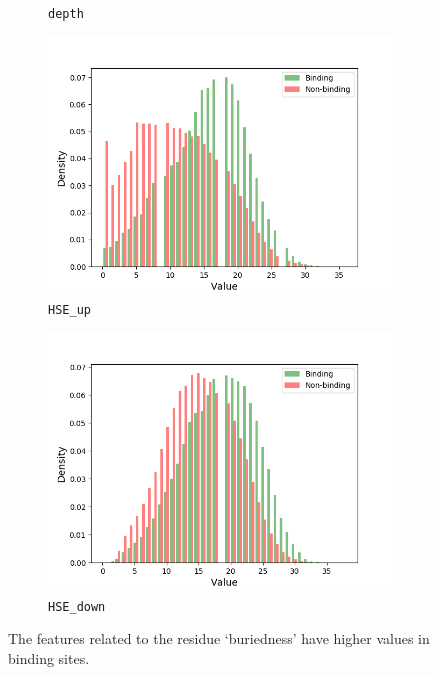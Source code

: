 \begin{figure}[]
\begin{subfigure}{.5\textwidth}
  \caption{\texttt{depth}}
\end{subfigure}
\begin{subfigure}{.5\textwidth}
  \centering
  \includegraphics[width=1\linewidth]{../img/HSE_up_hist.png}
  \caption{\texttt{HSE\_up}}
\end{subfigure}%
\begin{subfigure}{.5\textwidth}
  \centering
  \includegraphics[width=1\linewidth]{../img/HSE_down_hist.png}
  \caption{\texttt{HSE\_down}}
\end{subfigure}
\caption[The features related to the `buriedness']{The features related to the residue `buriedness' have higher values in binding sites.}
\label{fig:buriedness}
\end{figure}

